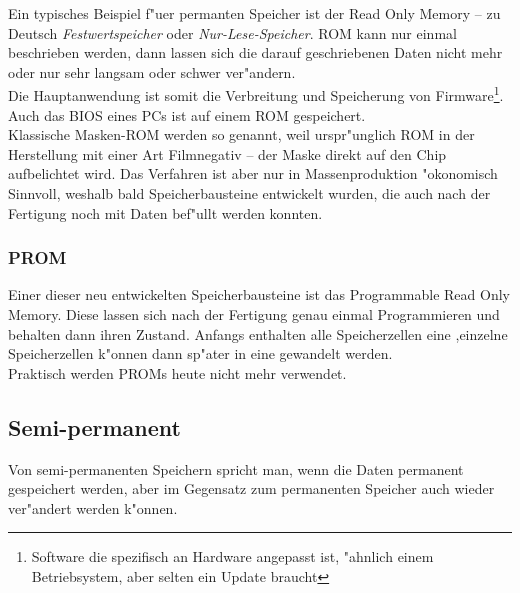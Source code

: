 					Ein typisches Beispiel f"uer permanten Speicher ist der \glqq Read Only Memory \grqq{} – zu Deutsch \textit{Festwertspeicher} oder \textit{Nur-Lese-Speicher}. ROM kann nur einmal beschrieben werden, dann lassen sich die darauf geschriebenen Daten nicht mehr oder nur sehr langsam oder schwer ver"andern. 
					\\
					Die Hauptanwendung ist somit die Verbreitung und Speicherung von Firmware\footnote[6]{Software die spezifisch an Hardware angepasst ist, "ahnlich einem Betriebsystem, aber selten ein Update braucht}. Auch das BIOS eines PCs ist auf einem ROM gespeichert.
					\\
					Klassische Masken-ROM werden so genannt, weil urspr"unglich ROM in der Herstellung mit einer Art Filmnegativ – der \glqq Maske\grqq{} direkt auf den Chip aufbelichtet wird. Das Verfahren ist aber nur in Massenproduktion "okonomisch Sinnvoll, weshalb bald Speicherbausteine entwickelt wurden, die auch nach der Fertigung noch mit Daten bef"ullt werden konnten.
				
				\subsubsection{PROM}
				\label{ch:Technisch:sec:Elektronische Speicherung:sub:Fl"uchtig:subsub:PROM}
				
					Einer dieser neu entwickelten Speicherbausteine ist das \glqq Programmable Read Only Memory\grqq{}. Diese lassen sich nach der Fertigung genau einmal Programmieren und behalten dann ihren Zustand. Anfangs enthalten alle Speicherzellen eine \grqq{},einzelne Speicherzellen k"onnen dann sp"ater in eine  \grqq{} gewandelt werden.
					\\
					Praktisch werden PROMs heute nicht mehr verwendet. 
            
        \subsection{Semi-permanent}
        \label{ch:Technisch:sec:Elektronische Speicherung:sub:Semi-permanent}
        
            Von semi-permanenten Speichern spricht man, wenn die Daten permanent gespeichert werden, aber im Gegensatz zum permanenten Speicher auch wieder ver"andert werden k"onnen. 
			
